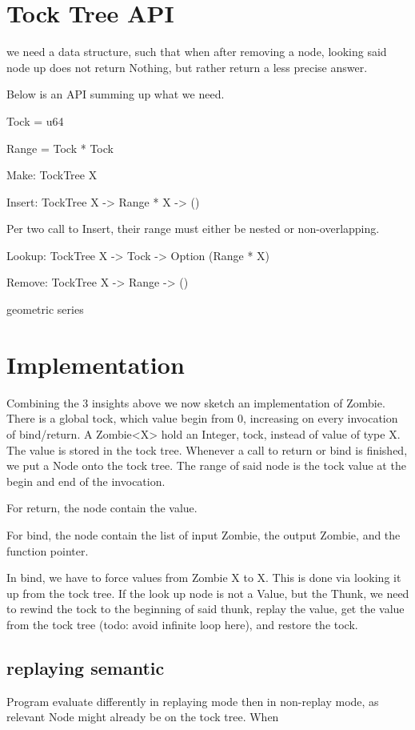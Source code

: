 \documentclass[acmsmall]{acmart}
\begin{document}
	\section{Tock Tree API}
	we need a data structure, such that when after removing a node, looking said node up does not return Nothing, but rather return a less precise answer.
	
	Below is an API summing up what we need.

	Tock = u64

	Range = Tock * Tock

	Make: TockTree X

	Insert: TockTree X -> Range * X -> ()

	Per two call to Insert, their range must either be nested or non-overlapping.

	Lookup: TockTree X -> Tock -> Option (Range * X)

	Remove: TockTree X -> Range -> ()
	
	geometric series

	\section{Implementation}
	Combining the 3 insights above we now sketch an implementation of Zombie.
	There is a global tock, which value begin from 0, increasing on every invocation of bind/return.
	A Zombie<X> hold an Integer, tock, instead of value of type X.
	The value is stored in the tock tree.
	Whenever a call to return or bind is finished, we put a Node onto the tock tree.
	The range of said node is the tock value at the begin and end of the invocation.
	
	For return, the node contain the value.
	
	For bind, the node contain the list of input Zombie, the output Zombie, and the function pointer.
	
	In bind, we have to force values from Zombie X to X. This is done via looking it up from the tock tree. If the look up node is not a Value, but the Thunk, we need to rewind the tock to the beginning of said thunk, replay the value, get the value from the tock tree (todo: avoid infinite loop here), and restore the tock.
	
	\subsection{replaying semantic}
	Program evaluate differently in replaying mode then in non-replay mode, as relevant Node might already be on the tock tree. When 
	
\end{document}

